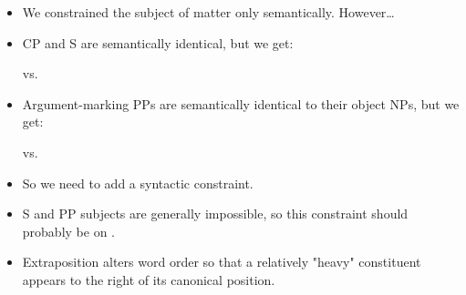 \documentclass[a4paper,landscape,headrule,footrule]{foils}
\begin{document}

\begin{itemize}
\item We constrained the subject of matter only semantically.  However\ldots{}
\item CP and S are semantically identical, but we get:
  \begin{exe} 
    \ex {}  vs. 
  \end{exe}
\item Argument-marking PPs are semantically identical to their object 
  NPs, but we get:
  \begin{exe} 
    \ex {} vs. 
  \end{exe}
\item So we need to add a syntactic constraint.
\end{itemize}

\newpage

\begin{center}\small
\end{center}


\begin{itemize}
\item  S and PP subjects are generally impossible, so this constraint should
   probably be on .
 \end{itemize}
 

\begin{itemize}
\item Extraposition alters word order so that a relatively "heavy"
  constituent appears to the right of its canonical position.
\end{itemize}

\begin{exe}\large
  \ex 
  \begin{xlist}
    \ex  {}
    \ex {}
  \end{xlist}
  \ex 
  \begin{xlist}
    \ex  {}
    \ex {}
  \end{xlist}
  \ex 
  \begin{xlist}
   \ex {}
   \ex  {}
  \end{xlist}
\end{exe}
\end{document}
